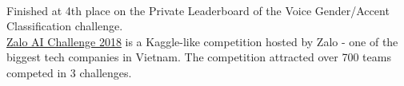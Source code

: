 \\
Finished at 4th place on the Private Leaderboard of the Voice Gender/Accent Classification challenge.\\
\indent \href{https://challenge.zalo.ai}{Zalo AI Challenge 2018} is a Kaggle-like competition hosted by Zalo - one of the biggest tech companies in Vietnam. The competition attracted over 700 teams competed in 3 challenges.\\

